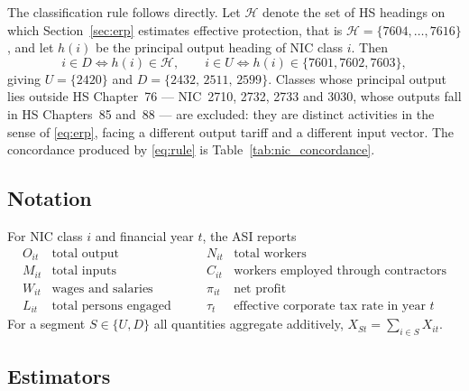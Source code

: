 The classification rule follows directly. Let $\mathcal{H}$ denote the set of HS
headings on which Section~\ref{sec:erp} estimates effective protection, that is
$\mathcal{H} = \{7604,\dots,7616\}$, and let $h(i)$ be the principal output
heading of NIC class $i$. Then
\begin{equation}
    i \in D \iff h(i) \in \mathcal{H},
    \qquad
    i \in U \iff h(i) \in \{7601, 7602, 7603\},
    \label{eq:rule}
\end{equation}
giving $U = \{2420\}$ and $D = \{2432,\, 2511,\, 2599\}$. Classes whose principal
output lies outside HS Chapter~76 --- NIC~2710, 2732, 2733 and 3030, whose outputs
fall in HS Chapters~85 and~88 --- are excluded: they are distinct activities in the
sense of \eqref{eq:erp}, facing a different output tariff and a different input
vector. The concordance produced by \eqref{eq:rule} is Table~\ref{tab:nic_concordance}.

\subsection{Notation}

For NIC class $i$ and financial year $t$, the ASI reports
\[
\begin{array}{ll}
O_{it} & \text{total output} \\
M_{it} & \text{total inputs} \\
W_{it} & \text{wages and salaries} \\
L_{it} & \text{total persons engaged}
\end{array}
\qquad
\begin{array}{ll}
N_{it} & \text{total workers} \\
C_{it} & \text{workers employed through contractors} \\
\pi_{it} & \text{net profit} \\
\tau_{t} & \text{effective corporate tax rate in year } t
\end{array}
\]
For a segment $S \in \{U, D\}$ all quantities aggregate additively,
$X_{St} = \sum_{i \in S} X_{it}$.

\subsection{Estimators}

